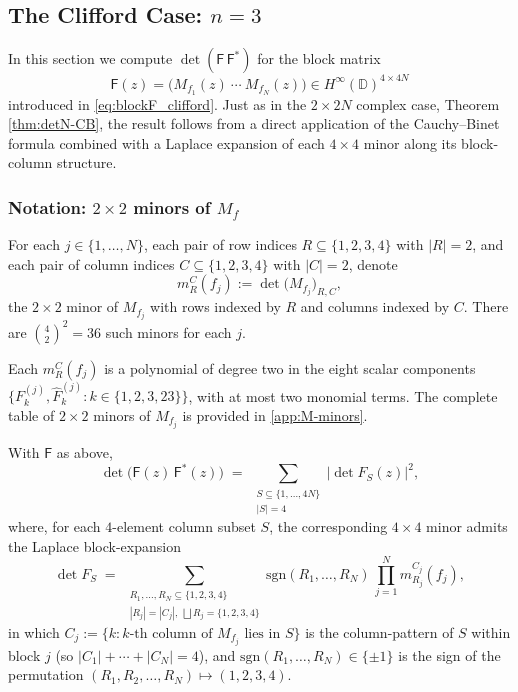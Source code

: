 \documentclass[11pt]{amsart}
\begin{document}
\subsection{\texorpdfstring{The Clifford Case: $n=3$}{The Clifford Case: n=3}}

In this section we compute $\det( \mathsf{F}\,\mathsf{F}^{\ast})$ for the block matrix
\[
\mathsf{F}(z)=\bigl(M_{f_1}(z)\ \cdots\ M_{f_N}(z)\bigr)\in H^\infty(\mathbb{D})^{4\times 4N}
\]
introduced in \eqref{eq:blockF_clifford}. Just as in the $2 \times 2N$ complex case, Theorem \ref{thm:detN-CB}, the result follows from a direct application of the Cauchy--Binet formula combined with a Laplace expansion of each $4\times 4$ minor along its block-column structure.

\subsubsection{Notation: $2\times 2$ minors of $M_f$}

For each $j \in \{1, \ldots, N\}$, each pair of row indices $R \subseteq \{1,2,3,4\}$ with $|R|=2$, and each pair of column indices $C \subseteq \{1,2,3,4\}$ with $|C|=2$, denote
\begin{equation}\label{eq:Mf-minor-22}
m_R^{C}(f_j) := \det\bigl(M_{f_j}\bigr)_{R, C},
\end{equation}
the $2\times 2$ minor of $M_{f_j}$ with rows indexed by $R$ and columns indexed by $C$. There are $\binom{4}{2}^2 = 36$ such minors for each $j$.

\begin{lemma}\label{lem:22-minors-of-Mf}
Each $m_R^{C}(f_j)$ is a polynomial of degree two in the eight scalar components $\{F_k^{(j)}, \hat F_k^{(j)} : k \in \{1,2,3,23\}\}$, with at most two monomial terms. The complete table of $2\times 2$ minors of $M_{f_j}$ is provided in \ref{app:M-minors}.
\end{lemma}


\begin{thm}\label{thm:clifford-CB}
With $\mathsf{F}$ as above,
\begin{equation}\label{eq:clifford-CB}
\det\bigl(\mathsf{F}(z)\,\mathsf{F}^*(z)\bigr)
\;=\;
\sum_{\substack{S \subseteq \{1,\ldots,4N\} \\ |S|=4}}\bigl|\det F_S(z)\bigr|^2,
\end{equation}
where, for each $4$-element column subset $S$, the corresponding $4\times 4$ minor admits the Laplace block-expansion
\begin{equation}\label{eq:laplace-minor}
\det F_S \;=\; \sum_{\substack{R_1, \ldots, R_N \subseteq \{1,2,3,4\} \\ |R_j|=|C_j|,\ \bigsqcup R_j = \{1,2,3,4\}}}\!\!\mathrm{sgn}(R_1, \ldots, R_N)\, \prod_{j=1}^{N} m_{R_j}^{C_j}(f_j),
\end{equation}
in which $C_j := \{k : k\text{-th column of }M_{f_j}\text{ lies in }S\}$ is the column-pattern of $S$ within block $j$ (so $|C_1| + \cdots + |C_N| = 4$), and $\mathrm{sgn}(R_1,\ldots,R_N) \in \{\pm 1\}$ is the sign of the permutation $(R_1, R_2, \ldots, R_N) \mapsto (1, 2, 3, 4)$.
\end{thm}
\end{document}
